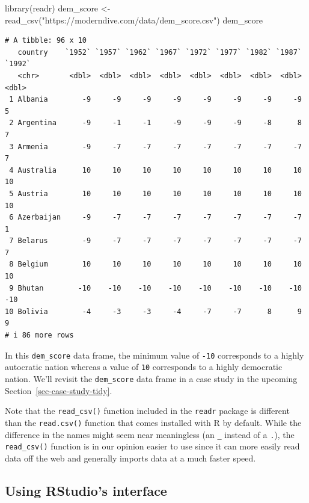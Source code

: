 \documentclass[
  letterpaper,
  DIV=11,
  numbers=noendperiod]{scrreprt}
\newenvironment{Shaded}{\begin{snugshade}}{\end{snugshade}}
\newcommand{\FunctionTok}[1]{\textcolor[rgb]{0.28,0.35,0.67}{#1}}
\newcommand{\NormalTok}[1]{\textcolor[rgb]{0.00,0.23,0.31}{#1}}
\newcommand{\OtherTok}[1]{\textcolor[rgb]{0.00,0.23,0.31}{#1}}
\newcommand{\StringTok}[1]{\textcolor[rgb]{0.13,0.47,0.30}{#1}}
\theoremstyle{definition}
\theoremstyle{remark}
\begin{document}
\begin{Shaded}
\begin{Highlighting}[]
\FunctionTok{library}\NormalTok{(readr)}
\NormalTok{dem\_score }\OtherTok{\textless{}{-}} \FunctionTok{read\_csv}\NormalTok{(}\StringTok{"https://moderndive.com/data/dem\_score.csv"}\NormalTok{)}
\NormalTok{dem\_score}
\end{Highlighting}
\end{Shaded}

\begin{verbatim}
# A tibble: 96 x 10
   country    `1952` `1957` `1962` `1967` `1972` `1977` `1982` `1987` `1992`
   <chr>       <dbl>  <dbl>  <dbl>  <dbl>  <dbl>  <dbl>  <dbl>  <dbl>  <dbl>
 1 Albania        -9     -9     -9     -9     -9     -9     -9     -9      5
 2 Argentina      -9     -1     -1     -9     -9     -9     -8      8      7
 3 Armenia        -9     -7     -7     -7     -7     -7     -7     -7      7
 4 Australia      10     10     10     10     10     10     10     10     10
 5 Austria        10     10     10     10     10     10     10     10     10
 6 Azerbaijan     -9     -7     -7     -7     -7     -7     -7     -7      1
 7 Belarus        -9     -7     -7     -7     -7     -7     -7     -7      7
 8 Belgium        10     10     10     10     10     10     10     10     10
 9 Bhutan        -10    -10    -10    -10    -10    -10    -10    -10    -10
10 Bolivia        -4     -3     -3     -4     -7     -7      8      9      9
# i 86 more rows
\end{verbatim}

In this \texttt{dem\_score} data frame, the minimum value of
\texttt{-10} corresponds to a highly autocratic nation whereas a value
of \texttt{10} corresponds to a highly democratic nation. We'll revisit
the \texttt{dem\_score} data frame in a case study in the upcoming
Section~\ref{sec-case-study-tidy}.

Note that the \texttt{read\_csv()} function included in the
\texttt{readr} package is different than the \texttt{read.csv()}
function that comes installed with R by default. While the difference in
the names might seem near meaningless (an \texttt{\_} instead of a
\texttt{.}), the \texttt{read\_csv()} function is in our opinion easier
to use since it can more easily read data off the web and generally
imports data at a much faster speed.

\hypertarget{using-rstudios-interface}{%
\subsection{Using RStudio's interface}\label{using-rstudios-interface}}
\end{document}
